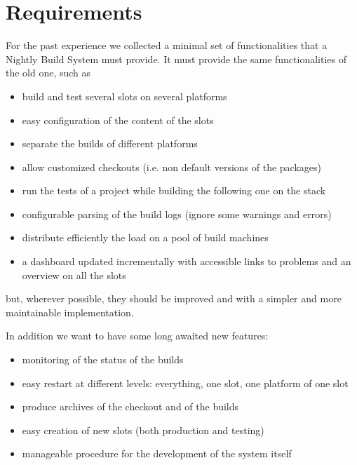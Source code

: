 \section{Requirements}
\label{sec:Requirements}
For the past experience we collected a minimal set of functionalities that a
Nightly Build System must provide. It must provide the same functionalities of the old one, such as
\begin{itemize}
  \item build and test several slots on several platforms
  \item easy configuration of the content of the slots
  \item separate the builds of different platforms
  \item allow customized checkouts (i.e. non default versions of the packages)
  \item run the tests of a project while building the following one on the stack
  \item configurable parsing of the build logs (ignore some warnings and errors)
  \item distribute efficiently the load on a pool of build machines
  \item a dashboard updated incrementally with accessible links to problems and
an overview on all the slots
\end{itemize}
but, wherever possible, they should be improved and with a simpler and more maintainable
implementation.

In addition we want to have some long awaited new features:
\begin{itemize}
  \item monitoring of the status of the builds
  \item easy restart at different levels: everything, one slot, one platform of
one slot
  \item produce archives of the checkout and of the builds
  \item easy creation of new slots (both production and testing)
  \item manageable procedure for the development of the system itself
\end{itemize}
